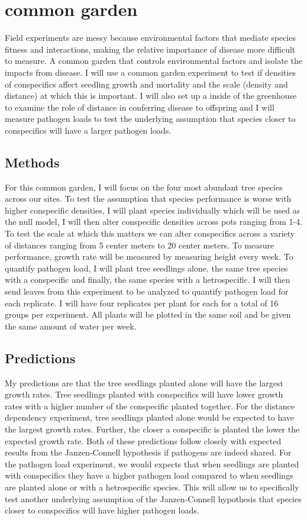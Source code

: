 \documentclass{article}
\begin{document}
\section{common garden}
Field experiments are messy because environmental factors that mediate species fitness and interactions, making the relative importance of disease more difficult to measure. A common garden that controls environmental factors and isolate the impacts from disease. I will use a common garden experiment to test if densities of conspecifics affect seedling growth and mortality and the scale (density and distance) at which this is important. I will also set up a inside of the greenhouse to examine the role of distance in conferring disease to offspring and I will measure pathogen loads to test the underlying assumption that species closer to conspecifics will have a larger pathogen loads. 

\subsection{Methods}
For this common garden, I will focus on the four most abundant tree species across our sites. To test the assumption that species performance is worse with higher conspecific densities, I will plant species individually which will be used as the null model, I will then alter conspecific densities across pots ranging from 1-4. To test the scale at which this matters we can alter conspecifics across a variety of distances ranging from 5 center meters to 20 center meters. To measure performance, growth rate will be measured by measuring height every week. To quantify pathogen load, I will plant tree seedlings alone, the same tree species with a conspecific and finally, the same species with a hetrospecific. I will then send leaves from this experiment to be analyzed to quantify pathogen load for each replicate. I will have four replicates per plant for each for a total of 16 groups per experiment. All plants will be plotted in the same soil and be given the same amount of water per week.

\subsection{Predictions}
My predictions are that the tree seedlings planted alone will have the largest growth rates. Tree seedlings planted with conspecifics will have lower growth rates with a higher number of the conspecific planted together. For the distance dependency experiment, tree seedlings planted alone would be expected to have the largest growth rates. Further, the closer a conspecific is planted the lower the expected growth rate. Both of these predictions follow closely with expected results from the Janzen-Connell hypothesis if pathogens are indeed shared. For the pathogen load experiment, we would expects that when seedlings are planted with conspecifics they have a higher pathogen load compared to when seedlings are planted alone or with a hetrospecific species. This will allow us to specifically test another underlying assumption of the Janzen-Connell hypothesis that species closer to conspecifics will have higher pathogen loads. 
\end{document}
